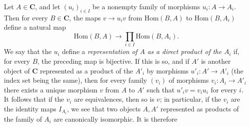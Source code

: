 Let $A\in\mathbf{C}$, and let $(u_i)_{i\in I}$ be a nonempty family of morphisms
$u_i:A\to A_i$. Then for every $B\in\mathbf{C}$, the maps
$v\to u_iv$ from $\mathrm{Hom}(B,A)$ to $\mathrm{Hom}(B,A_i)$
define a natural map
\[
  \mathrm{Hom}(B,A)\to
  \prod_{i\in I}\mathrm{Hom}(B,A_i).
\]
We say that the $u_i$ define a \textit{representation of $A$ as a direct
product of the $A_i$} if, for every $B$, the preceding map is bijective. If
this is so, and if $A'$ is another object of $\mathbf{C}$ represented as a product of
the $A'_i$ by morphisms $u'_i:A'\to A'_i$ (the index set being the
same), then for every family $(v_i)$ of morphisms
$v_i:A_i\to A'_i$ there exists a unique morphism $v$ from $A$ to
$A'$ such that $u'_iv=v_iu_i$ for every $i$. It follows that if the $v_i$ are
equivalences, then so is $v$; in particular, if the $v_i$ are the identity
maps $I_{A_i}$, we see that two objects $A,A'$ represented as products of the
family of $A_i$ are canonically isomorphic. It is therefore

